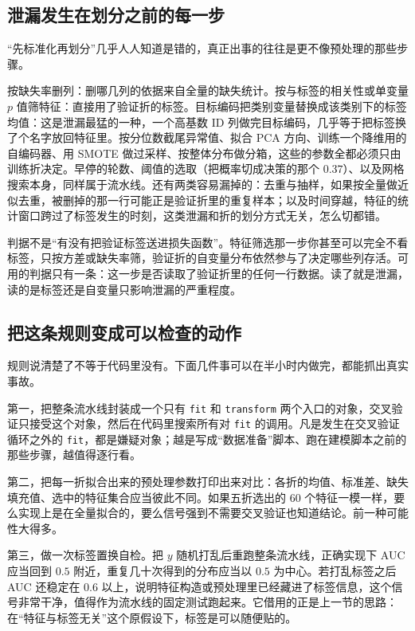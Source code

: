 \subsection{泄漏发生在划分之前的每一步}

``先标准化再划分''几乎人人知道是错的，真正出事的往往是更不像预处理的那些步骤。

按缺失率删列：删哪几列的依据来自全量的缺失统计。按与标签的相关性或单变量 \(p\) 值筛特征：直接用了验证折的标签。目标编码把类别变量替换成该类别下的标签均值：这是泄漏最猛的一种，一个高基数 ID 列做完目标编码，几乎等于把标签换了个名字放回特征里。按分位数截尾异常值、拟合 PCA 方向、训练一个降维用的自编码器、用 SMOTE 做过采样、按整体分布做分箱，这些的参数全都必须只由训练折决定。早停的轮数、阈值的选取（把概率切成决策的那个 \(0.37\)）、以及网格搜索本身，同样属于流水线。还有两类容易漏掉的：去重与抽样，如果按全量做近似去重，被删掉的那一行可能正是验证折里的重复样本；以及时间穿越，特征的统计窗口跨过了标签发生的时刻，这类泄漏和折的划分方式无关，怎么切都错。

判据不是``有没有把验证标签送进损失函数''。特征筛选那一步你甚至可以完全不看标签，只按方差或缺失率筛，验证折的自变量分布依然参与了决定哪些列存活。可用的判据只有一条：这一步是否读取了验证折里的任何一行数据。读了就是泄漏，读的是标签还是自变量只影响泄漏的严重程度。

\subsection{把这条规则变成可以检查的动作}

规则说清楚了不等于代码里没有。下面几件事可以在半小时内做完，都能抓出真实事故。

第一，把整条流水线封装成一个只有 \texttt{fit} 和 \texttt{transform} 两个入口的对象，交叉验证只接受这个对象，然后在代码里搜索所有对 \texttt{fit} 的调用。凡是发生在交叉验证循环之外的 \texttt{fit}，都是嫌疑对象；越是写成``数据准备''脚本、跑在建模脚本之前的那些步骤，越值得逐行看。

第二，把每一折拟合出来的预处理参数打印出来对比：各折的均值、标准差、缺失填充值、选中的特征集合应当彼此不同。如果五折选出的 \(60\) 个特征一模一样，要么实现上是在全量拟合的，要么信号强到不需要交叉验证也知道结论。前一种可能性大得多。

第三，做一次标签置换自检。把 \(y\) 随机打乱后重跑整条流水线，正确实现下 AUC 应当回到 \(0.5\) 附近，重复几十次得到的分布应当以 \(0.5\) 为中心。若打乱标签之后 AUC 还稳定在 \(0.6\) 以上，说明特征构造或预处理里已经藏进了标签信息，这个信号非常干净，值得作为流水线的固定测试跑起来。它借用的正是上一节的思路：在``特征与标签无关''这个原假设下，标签是可以随便贴的。

